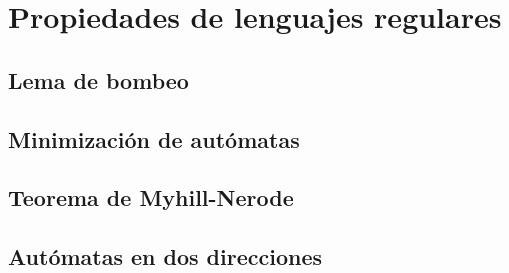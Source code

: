 \section{Propiedades de lenguajes regulares}

\subsection{Lema de bombeo}

\subsection{Minimización de autómatas}

\subsection{Teorema de Myhill-Nerode}

\subsection{Autómatas en dos direcciones}